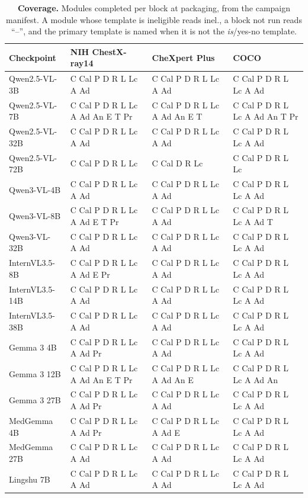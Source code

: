 \begin{table}[htbp]
\centering
\scriptsize
\setlength{\tabcolsep}{4pt}
\caption{\textbf{Coverage.} Modules completed per block at packaging, from the campaign manifest. A module whose template is ineligible reads inel., a block not run reads ``--'', and the primary template is named when it is not the \emph{is}/yes-no template.}
\label{tab:cf-coverage}
\begin{tabular}{llll}
\toprule
Checkpoint & NIH ChestX-ray14 & CheXpert Plus & COCO\\
\midrule
Qwen2.5-VL-3B & C Cal P D R L Lc A Ad & C Cal P D R L Lc A Ad & C Cal P D R L Lc A Ad \\
Qwen2.5-VL-7B & C Cal P D R L Lc A Ad An E T Pr & C Cal P D R L Lc A Ad An E T & C Cal P D R L Lc A Ad An T Pr \\
Qwen2.5-VL-32B & C Cal P D R L Lc A Ad & C Cal P D R L Lc A Ad & C Cal P D R L Lc A Ad \\
Qwen2.5-VL-72B & C Cal P D R L Lc & C Cal D R Lc & C Cal P D R L Lc \\
Qwen3-VL-4B & C Cal P D R L Lc A Ad & C Cal P D R L Lc A Ad & C Cal P D R L Lc A Ad \\
Qwen3-VL-8B & C Cal P D R L Lc A Ad E T Pr & C Cal P D R L Lc A Ad & C Cal P D R L Lc A Ad T \\
Qwen3-VL-32B & C Cal P D R L Lc A Ad & C Cal P D R L Lc A Ad & C Cal P D R L Lc A Ad \\
InternVL3.5-8B & C Cal P D R L Lc A Ad E Pr & C Cal P D R L Lc A Ad & C Cal P D R L Lc A Ad \\
InternVL3.5-14B & C Cal P D R L Lc A Ad & C Cal P D R L Lc A Ad & C Cal P D R L Lc A Ad \\
InternVL3.5-38B & C Cal P D R L Lc A Ad & C Cal P D R L Lc A Ad & C Cal P D R L Lc A Ad \\
Gemma 3 4B & C Cal P D R L Lc A Ad Pr & C Cal P D R L Lc A Ad & C Cal P D R L Lc A Ad \\
Gemma 3 12B & C Cal P D R L Lc A Ad An E T Pr & C Cal P D R L Lc A Ad An E & C Cal P D R L Lc A Ad An \\
Gemma 3 27B & C Cal P D R L Lc A Ad Pr & C Cal P D R L Lc A Ad & C Cal P D R L Lc A Ad \\
MedGemma 4B & C Cal P D R L Lc A Ad Pr & C Cal P D R L Lc A Ad E & C Cal P D R L Lc A Ad \\
MedGemma 27B & C Cal P D R L Lc A Ad & C Cal P D R L Lc A Ad & C Cal P D R L Lc A Ad \\
Lingshu 7B & C Cal P D R L Lc A Ad & C Cal P D R L Lc A Ad & C Cal P D R L Lc A Ad \\

\end{tabular}
\end{table}
